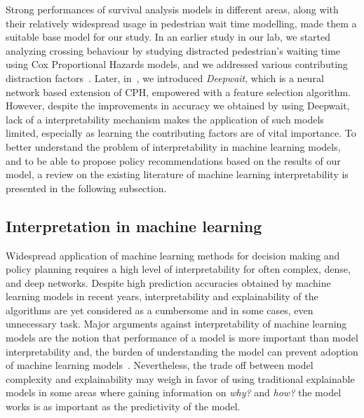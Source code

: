Strong performances of survival analysis models in different areas, along with their relatively widespread usage in pedestrian wait time modelling, made them a suitable base model for our study. In an earlier study in our lab, we started analyzing crossing behaviour by studying distracted pedestrian's waiting time using Cox Proportional Hazards models, and we addressed various contributing distraction factors~\citep{kalatian2018cox}. Later, in~\citep{kalatian2019deepwait}, we introduced \textit{Deepwait}, which is a neural network based extension of CPH, empowered with a feature selection algorithm. However, despite the improvements in accuracy we obtained by using Deepwait, lack of a interpretability mechanism makes the application of such models limited, especially as learning the contributing factors are of vital importance. To better understand the problem of interpretability in machine learning models, and to be able to propose policy recommendations based on the results of our model, a review on the existing literature of machine learning interpretability is presented in the following subsection.
\subsection{Interpretation in machine learning}
Widespread application of machine learning methods for decision making and policy planning requires a high level of interpretability for often complex, dense, and deep networks. Despite high prediction accuracies obtained by machine learning models in recent years, interpretability and explainability of the algorithms are yet considered as a cumbersome and in some cases, even unnecessary task. Major arguments against interpretability of machine learning models are the notion that performance of a model is more important than model interpretability and, the burden of understanding the model can prevent adoption of machine learning models~\citep{lipton2016mythos}. Nevertheless, the trade off between model complexity and explainability may weigh in favor of using traditional explainable models in some areas where gaining information on \textit{why?} and \textit{how?} the model works is as important as the predictivity of the model.


